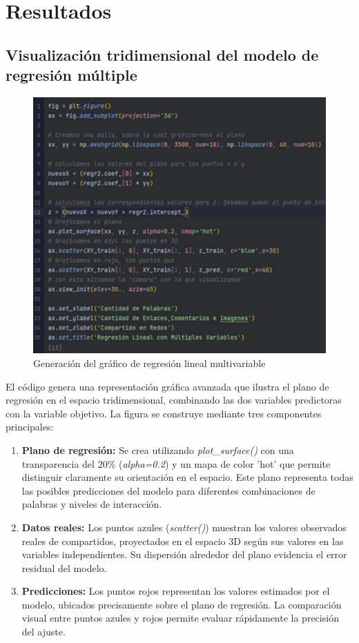 \documentclass[12pt, a4paper]{article}
\begin{document}
\newpage

\section{Resultados}

\subsection{Visualización tridimensional del modelo de regresión múltiple}

\begin{figure}[H]
    \centering
    \includegraphics[width=1.0\textwidth]{Actividad-10/Imagen5.png}
    \caption{Generación del gráfico de regresión lineal multivariable}
\end{figure}

El código genera una representación gráfica avanzada que ilustra el plano de regresión en el espacio tridimensional, combinando las dos variables predictoras con la variable objetivo. La figura se construye mediante tres componentes principales:

\begin{enumerate}
    \item\textbf{Plano de regresión:} Se crea utilizando \textit{plot\_surface()} con una transparencia del 20\% (\textit{alpha=0.2}) y un mapa de color 'hot' que permite distinguir claramente su orientación en el espacio. Este plano representa todas las posibles predicciones del modelo para diferentes combinaciones de palabras y niveles de interacción.
    \item\textbf{Datos reales:} Los puntos azules (\textit{scatter()}) muestran los valores observados reales de compartidos, proyectados en el espacio 3D según sus valores en las variables independientes. Su dispersión alrededor del plano evidencia el error residual del modelo.
    \item\textbf{Predicciones:} Los puntos rojos representan los valores estimados por el modelo, ubicados precisamente sobre el plano de regresión. La comparación visual entre puntos azules y rojos permite evaluar rápidamente la precisión del ajuste.
\end{enumerate}
\end{document}
